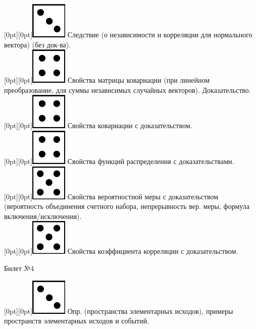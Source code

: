 \documentclass[10pt]{article}
\begin{document}
\raisebox{-1pt}[0pt][0pt]{\includegraphics[width=0.02\linewidth]{3.png}} Следствие (о независимости и корреляции для нормального вектора) (без док-ва). \\ 

\raisebox{-1pt}[0pt][0pt]{\includegraphics[width=0.02\linewidth]{4.png}} Свойства матрицы ковариации (при линейном преобразование, для суммы независимых случайных векторов). Доказательство. \\

\raisebox{-1pt}[0pt][0pt]{\includegraphics[width=0.02\linewidth]{4.png}} Свойства ковариации с доказательством. \\

\raisebox{-1pt}[0pt][0pt]{\includegraphics[width=0.02\linewidth]{4.png}} Свойства функций распределения с доказательствами. \\

\raisebox{-1pt}[0pt][0pt]{\includegraphics[width=0.02\linewidth]{5.png}} Свойства  вероятностной меры с доказательством (вероятность объединения счетного набора, непрерывность вер. меры, формула включения/исключения). \\

\raisebox{-1pt}[0pt][0pt]{\includegraphics[width=0.02\linewidth]{5.png}} Свойства коэффициента корреляции с доказательством. \\

\begin{center} {\Large Билет №4} \end{center} 

\raisebox{-1pt}[0pt][0pt]{\includegraphics[width=0.02\linewidth]{3.png}} Опр. (пространства элементарных исходов), примеры пространств элементарных исходов и событий. \\
\end{document}
